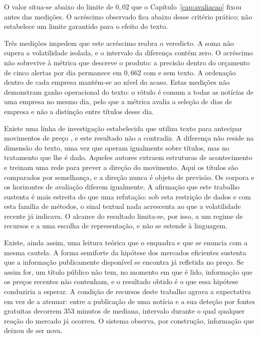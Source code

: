 O valor situa-se abaixo do limite de $0{,}02$ que o Capítulo~\ref{cap:avaliacao} fixou antes das
medições. O acréscimo observado fica abaixo desse critério prático; não estabelece um limite
garantido para o efeito do texto.

Três medições impedem que este acréscimo reabra o veredicto. A soma não supera a volatilidade isolada, e o intervalo da diferença contém zero. O acréscimo não
sobrevive à métrica que descreve o produto: a precisão dentro do orçamento de cinco alertas por
dia permanece em $0{,}662$ com e sem texto. A ordenação dentro de cada empresa mantém-se ao
nível do acaso. Estas medições não demonstram ganho operacional do texto: o rótulo é comum a
todas as notícias de uma empresa no mesmo dia, pelo que a métrica avalia a seleção de dias de
empresa e não a distinção entre títulos desse dia.

Existe uma linha de investigação estabelecida que utiliza texto para antecipar movimentos de preço
\autocite{xing2018nlffsurvey, ding2015deep}, e este resultado não a contradiz. A diferença não reside na dimensão do texto, uma vez que \textcite{ding2015deep} operam igualmente
sobre títulos, mas no tratamento que lhe é dado. Aqueles autores extraem estruturas de
acontecimento e treinam uma rede para prever a direção do movimento. Aqui os títulos são
comparados por semelhança, e a direção nunca é objeto de previsão. Os corpora e os horizontes de avaliação diferem igualmente. A
afirmação que este trabalho sustenta é mais estreita do que uma refutação: sob esta restrição de
dados e com esta família de métodos, o sinal textual nada acrescenta ao que a volatilidade recente
já indicava. O alcance do resultado limita-se, por isso, a um regime de recursos e a uma escolha de
representação, e não se estende à linguagem.

Existe, ainda assim, uma leitura teórica que o enquadra e que se enuncia com a mesma cautela. A
forma semiforte da hipótese dos mercados eficientes \autocite{fama1970efficient} sustenta que a
informação publicamente disponível se encontra já refletida no preço. Se assim for, um título
público não tem, no momento em que é lido, informação que os preços recentes não contenham, e o
resultado obtido é o que essa hipótese conduziria a esperar. A condição de recursos deste trabalho
agrava a expectativa em vez de a atenuar: entre a publicação de uma notícia e a sua deteção por
fontes gratuitas decorrem $353$ minutos de mediana, intervalo durante o qual qualquer reação do
mercado já ocorreu. O sistema observa, por construção, informação que deixou de ser nova.

